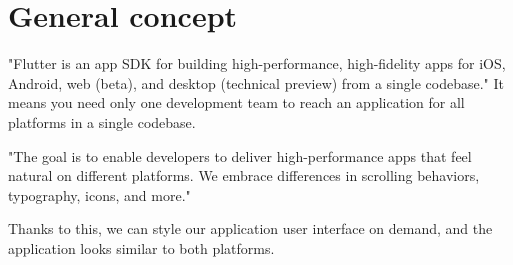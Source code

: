 \section{General concept}\label{sec:general-concept}
"Flutter is an app SDK for building high-performance, high-fidelity apps for iOS, Android, web (beta), and desktop (technical preview) from a single codebase."\cite{flutterTechnicalOverview}
It means you need only one development team to reach an application for all platforms in a single codebase.

"The goal is to enable developers to deliver high-performance apps that feel natural on different platforms.
We embrace differences in scrolling behaviors, typography, icons, and more."\cite{flutterTechnicalOverview}

Thanks to this, we can style our application user interface on demand, and the application looks similar to both platforms.


